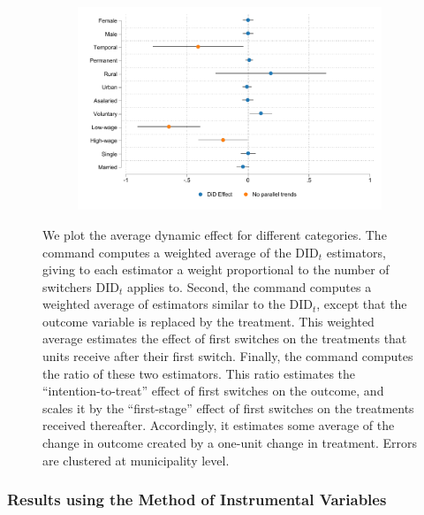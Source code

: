 \documentclass[oneside,11pt]{article}
\begin{document}
\begin{figure}[H]
     \caption{Heterogeneous effects}
    \label{did_het}
\begin{center}
       \begin{subfigure}{0.55\textwidth}
        \includegraphics[width=\textwidth]{Figuras/did_het.pdf}
    \end{subfigure}
  \end{center}
    \scriptsize 
    
We plot the average dynamic effect for different categories. The command computes a weighted average of the $\text{DID}_t$ estimators, giving to each estimator a weight proportional to the number of switchers $\text{DID}_t$ applies to. Second, the command computes a weighted average of estimators similar to the $\text{DID}_t$, except that the outcome variable is replaced by the treatment.  This weighted average estimates the effect of first switches on the treatments that units receive after their first switch. Finally, the command computes the ratio of these two estimators. This ratio estimates the ``intention-to-treat'' effect of first switches on the outcome, and scales it by the ``first-stage'' effect of first switches on the treatments received thereafter. Accordingly, it estimates some average of the change in outcome created by a one-unit change in treatment.  Errors are clustered at municipality level.
\end{figure}



\subsubsection{Results using the Method of Instrumental Variables}
\end{document}
